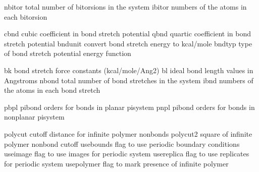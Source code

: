 \documentclass[letterpaper,11pt,english]{sphinxmanual}
\begin{document}

\begin{sphinxVerbatim}[commandchars=\\\{\}]
nbitor          total number of bitorsions in the system
ibitor          numbers of the atoms in each bitorsion
\end{sphinxVerbatim}


\begin{sphinxVerbatim}[commandchars=\\\{\}]
cbnd            cubic coefficient in bond stretch potential
qbnd            quartic coefficient in bond stretch potential
bndunit         convert bond stretch energy to kcal/mole
bndtyp          type of bond stretch potential energy function
\end{sphinxVerbatim}


\begin{sphinxVerbatim}[commandchars=\\\{\}]
bk              bond stretch force constants (kcal/mole/Ang\PYGZca{}2)
bl              ideal bond length values in Angstroms
nbond           total number of bond stretches in the system
ibnd            numbers of the atoms in each bond stretch
\end{sphinxVerbatim}


\begin{sphinxVerbatim}[commandchars=\\\{\}]
pbpl            pi\PYGZhy{}bond orders for bonds in \PYGZdq{}planar\PYGZdq{} pisystem
pnpl            pi\PYGZhy{}bond orders for bonds in \PYGZdq{}nonplanar\PYGZdq{} pisystem
\end{sphinxVerbatim}


\begin{sphinxVerbatim}[commandchars=\\\{\}]
polycut         cutoff distance for infinite polymer nonbonds
polycut2        square of infinite polymer nonbond cutoff
use\PYGZus{}bounds      flag to use periodic boundary conditions
use\PYGZus{}image       flag to use images for periodic system
use\PYGZus{}replica     flag to use replicates for periodic system
use\PYGZus{}polymer     flag to mark presence of infinite polymer
\end{sphinxVerbatim}
\end{document}
